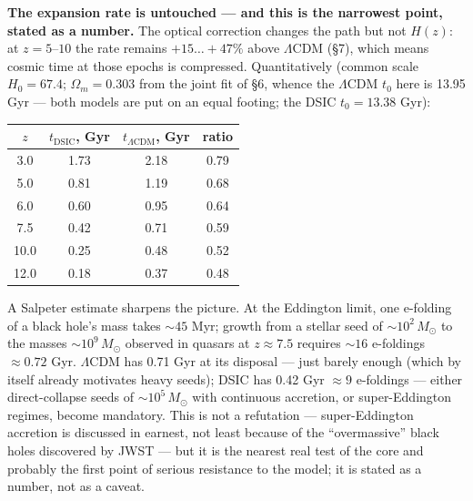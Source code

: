 \documentclass{article}
\begin{document}
\medskip
\noindent\textbf{The expansion rate is untouched --- and this is the narrowest point, stated as a number.} The optical correction changes the path but not $H(z)$: at $z = 5\text{--}10$ the rate remains $+15\ldots+47\%$ above $\Lambda$CDM (\S7), which means cosmic time at those epochs is compressed. Quantitatively (common scale $H_0 = 67.4$; $\Omega_m = 0.303$ from the joint fit of \S6, whence the $\Lambda$CDM $t_0$ here is 13.95 Gyr --- both models are put on an equal footing; the DSIC $t_0 = 13.38$ Gyr):

\begin{table}[htbp]
\centering
\small
\begin{tabular}{@{}cccc@{}}
\toprule
$z$ & $t_{\text{DSIC}}$, Gyr & $t_{\Lambda\text{CDM}}$, Gyr & ratio \\
\midrule
3.0 & 1.73 & 2.18 & 0.79 \\
5.0 & 0.81 & 1.19 & 0.68 \\
6.0 & 0.60 & 0.95 & 0.64 \\
7.5 & 0.42 & 0.71 & 0.59 \\
10.0 & 0.25 & 0.48 & 0.52 \\
12.0 & 0.18 & 0.37 & 0.48 \\
\bottomrule
\end{tabular}
\end{table}

A Salpeter estimate sharpens the picture. At the Eddington limit, one e-folding of a black hole's mass takes ${\sim}45$ Myr; growth from a stellar seed of ${\sim}10^2\,M_\odot$ to the masses ${\sim}10^9\,M_\odot$ observed in quasars at $z \approx 7.5$ requires ${\sim}16$ e-foldings $\approx 0.72$ Gyr. $\Lambda$CDM has 0.71 Gyr at its disposal --- just barely enough (which by itself already motivates heavy seeds); DSIC has 0.42 Gyr $\approx 9$ e-foldings --- either direct-collapse seeds of ${\sim}10^5\,M_\odot$ with continuous accretion, or super-Eddington regimes, become mandatory. This is not a refutation --- super-Eddington accretion is discussed in earnest, not least because of the ``overmassive'' black holes discovered by JWST --- but it is the nearest real test of the core and probably the first point of serious resistance to the model; it is stated as a number, not as a caveat.
\end{document}
